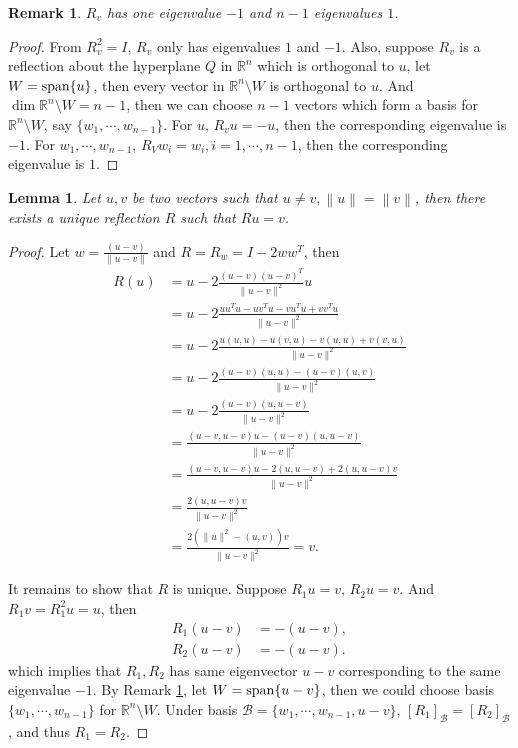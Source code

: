 \documentclass[10pt]{book}
\newtheorem{lemma}[theorem]{Lemma}
\newtheorem{remark}{Remark}[chapter]
\theoremstyle{definition}
\numberwithin{equation}{chapter}
\begin{document}
\begin{subappendices}
\begin{remark}\label{eigenvalue_of_reflection}
$R_v$ has one eigenvalue $-1$ and $n-1$ eigenvalues $1$.
\end{remark}
\begin{proof}
From $R_v^2 = I$, $R_v$ only has eigenvalues $1$ and $-1$. Also, suppose $R_v$ is a reflection about the hyperplane $Q$ in $\mathbb{R}^n$ which is orthogonal to $u$, let $W = {\rm  span}\{u\}$, then every vector in $\mathbb{R}^n\setminus W$ is orthogonal to $u$. And $\dim \mathbb{R}^n\setminus W = n - 1$, then we can choose $n - 1$ vectors which form a basis for $\mathbb{R}^n\setminus W$, say $\{w_1, \cdots, w_{n-1}\}$. For $u$, $R_v u = - u$, then the corresponding eigenvalue is $-1$. For $w_1, \cdots, w_{n-1}$, $R_V w_i = w_i, i = 1, \cdots, n-1$, then the corresponding eigenvalue is $1$.
\end{proof}

\medskip

\begin{lemma}{\rm \cite{35}}
Let $u, v$ be two vectors such that $u \neq v, \left\|u\right\| = \left\|v\right\|$, then there exists a unique reflection $R$ such that $Ru = v$.
\end{lemma}
\begin{proof}
Let $w = \frac{(u-v)}{\|u-v\|}$ and $R = R_w = I - 2 ww^T$, then
\begin{align*}
    R(u) & = u - 2 \frac{(u-v)(u-v)^T}{\|u-v\|^2}u \\
    & = u - 2 \frac{uu^Tu - uv^Tu - vu^Tu + vv^Tu}{\|u-v\|^2} \\
    & = u - 2 \frac{u(u,u) - u(v,u) - v(u,u) + v(v,u)}{\|u-v\|^2} \\
    & = u - 2 \frac{(u-v)(u,u) - (u-v)(u,v)}{\|u-v\|^2} \\
    & = u - 2 \frac{(u-v)(u,u-v)}{\|u-v\|^2} \\
    & = \frac{(u-v,u-v)u - (u-v)(u,u-v)}{\|u-v\|^2} \\
    & = \frac{(u-v,u-v)u - 2(u,u-v) + 2(u,u-v)v}{\|u-v\|^2} \\
    & = \frac{2(u,u-v)v}{\|u-v\|^2} \\
    & = \frac{2(\|u\|^2 - (u,v))v}{\|u-v\|^2} = v.
\end{align*}

It remains to show that $R$ is unique. Suppose $R_1 u = v$, $R_2 u = v$. And $R_1 v = R_1^2 u = u$, then 
\begin{align*}
    R_1 (u-v) & = - (u-v), \\
    R_2 (u-v) & = - (u-v).
\end{align*}
which implies that $R_1, R_2$ has same eigenvector $u - v$ corresponding to the same eigenvalue $-1$. By Remark \ref{eigenvalue_of_reflection}, let $W = {\rm span}\{u-v\}$, then we could choose basis $\{w_1, \cdots, w_{n-1}\}$ for $\mathbb{R}^n \setminus W$. Under basis $\mathcal{B} = \{w_1, \cdots, w_{n-1}, u-v\}$, $[R_1]_{\mathcal{B}} = [R_2]_{\mathcal{B}}$, and thus $R_1 = R_2$.
\end{proof}


\end{subappendices}
\end{document}
